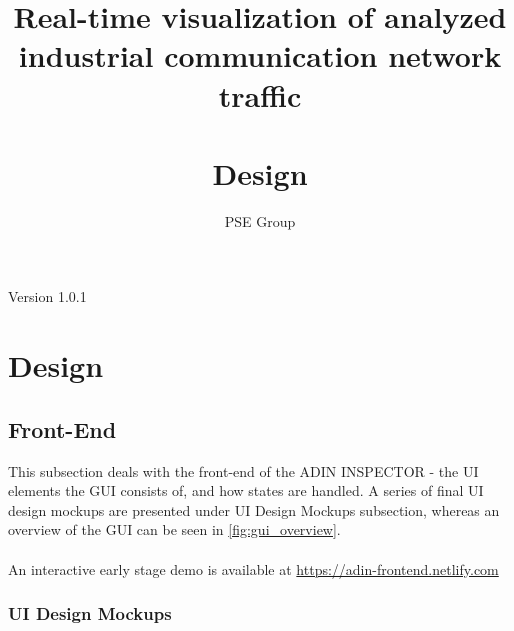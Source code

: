 \documentclass[oneside, english, final]{design}
\author{PSE Group}
\title{Real-time visualization of analyzed industrial communication network traffic\\ \hfill \\Design}
\begin{document}
\nocite{*}

\setpdf

\maketitle


\hfill

\begin{center}
	\large{Version 1.0.1}
\end{center}


\thispagestyle{empty}
\begin{abstract}
	\thispagestyle{empty}
\end{abstract}

\thispagestyle{empty}
\newpage
\thispagestyle{empty}
\tableofcontents
\cleardoublepage
\setcounter{page}{1}


\section{Design}\label{sec:intro}
\subsection{Front-End}
This subsection deals with the front-end of the ADIN INSPECTOR - the UI elements the GUI consists of, and how states are handled. A series of final UI design mockups are presented under UI Design Mockups subsection, whereas an overview of the GUI can be seen in \autoref{fig:gui_overview}.\\
\\
An interactive early stage demo is available at \url{https://adin-frontend.netlify.com}

\subsubsection{UI Design Mockups}
\end{document}
